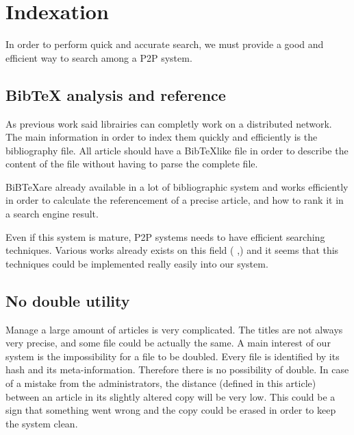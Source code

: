 \section{Indexation}

In order to perform quick and accurate search, we must provide a good and efficient
way to search among a P2P system.

\subsection{Bib\TeX{} analysis and reference}

As previous work said \cite{Lawrence99digitallibraries} librairies
can completly work on a distributed network. The main information in order
to index them quickly and efficiently is the bibliography file. All article should
have a Bib\TeX like file in order to describe the content of the file without having
to parse the complete file.

BiB\TeX are already available in a lot of bibliographic system and works efficiently
in order to calculate the referencement of a precise article, and how to rank it in 
a search engine result.

Even if this system is mature, P2P systems needs to 
have efficient searching techniques. Various works already exists on this 
field (\cite{Reynolds_efficientpeer-to-peer} ,\cite{Yang02improvingsearch})
and it seems that this techniques could be implemented really easily 
into our system.

\subsection{No double utility}

Manage a large amount of articles is very complicated. The titles
are not always very precise, and some file could be actually the same.
A main interest of our system is the impossibility for a 
file to be doubled. Every file is identified by its hash and its
meta-information. Therefore there is no possibility of double. In
case of a mistake from the administrators, the distance (defined in
this article) between
an article in its slightly altered copy will be very low. This could
be a sign that something went wrong and the copy could be erased in
order to keep the system clean.
